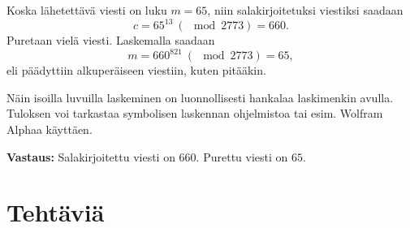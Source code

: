 Koska lähetettävä viesti on luku $m=65$, niin salakirjoitetuksi viestiksi saadaan
\[
c= 65^{13}\ (\mod  2773) = 660.
\]
Puretaan vielä viesti. Laskemalla saadaan
\[
m=660^{821}\ (\mod  2773) = 65,
\]
eli päädyttiin alkuperäiseen viestiin, kuten pitääkin.

Näin isoilla luvuilla laskeminen on luonnollisesti hankalaa laskimenkin avulla. Tuloksen voi tarkastaa symbolisen laskennan ohjelmistoa tai esim. Wolfram Alphaa käyttäen. 

{\bf Vastaus:} Salakirjoitettu viesti on $660$. Purettu viesti on $65$.


\newpage

\section*{Tehtäviä}

